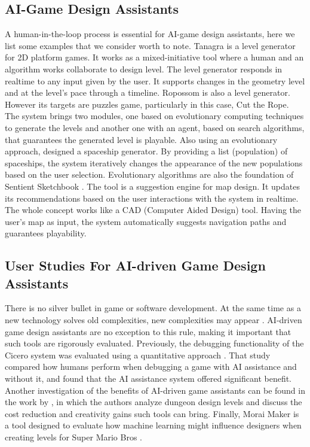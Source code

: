 \documentclass[letterpaper]{article} %
\begin{document}
\subsection{AI-Game Design Assistants}
A human-in-the-loop process is essential for AI-game design assistants, here we list some examples that we consider worth to note. Tanagra \cite{smith2010tanagra} is a level generator for 2D platform games.  It works as a mixed-initiative tool where a human and an algorithm works collaborate  to design level. The level generator responds in realtime to any input given by the user. It supports changes in the geometry level and at the level's pace through a timeline. Ropossom \cite{shaker2013ropossum} is also a level generator. However its targets are puzzles game, particularly in this case, Cut the Rope. The system brings two modules, one based on evolutionary computing techniques to generate the levels and another one with an agent, based on search algorithms, that guarantees the generated level is playable. Also using an evolutionary approach, \cite{6185648} designed a spaceship generator. By providing a list (population) of spaceships, the system iteratively changes the appearance of the new populations based on the user selection. Evolutionary algorithms are also the foundation of Sentient Sketchbook \cite{liapis2013sentient}. The tool is a suggestion engine for map design. It updates its recommendations based on the user interactions with the system in realtime. The whole concept works like a CAD (Computer Aided Design) tool. Having the user's map as input, the system automatically suggests navigation paths and guarantees playability.

\subsection{User Studies For AI-driven Game Design Assistants}
There is no silver bullet in game or software development. At the same time as a new technology solves old complexities, new complexities may appear \cite{4420077}. AI-driven game design assistants are no exception to this rule, making it important that such tools are rigorously evaluated. Previously, the debugging functionality of the Cicero system was evaluated using a quantitative approach \cite{Machado2018AIAssistedGD}. That study compared how humans perform when debugging a game with AI assistance and without it, and found that the AI assistance system offered significant benefit. Another investigation of the benefits of AI-driven game assistants can be found in the work by  \cite{alvarez2018fostering}, in which the authors analyze dungeon design levels and discuss the cost reduction and creativity gains such tools can bring. Finally, Morai Maker is a tool designed to evaluate how machine learning might influence designers when creating levels for Super Mario Bros \cite{guzdial2019friend}.
\end{document}
